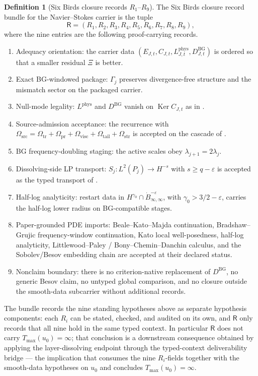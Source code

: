 \documentclass[11pt]{article}
\DeclareMathOperator{\Ker}{Ker}
\newcommand{\eps}{\varepsilon}
\newcommand{\DBG}{D^{\mathrm{BG}}}
\newcommand{\Lphys}{L^{\mathrm{phys}}}
\newcommand{\Tmax}{T_{\max}}
\newcommand{\Omsrc}{\Omega_{\mathrm{src}}}
\newcommand{\Omtr}{\Omega_{\mathrm{tr}}}
\newcommand{\Ompr}{\Omega_{\mathrm{pr}}}
\newcommand{\Omvisc}{\Omega_{\mathrm{visc}}}
\newcommand{\Omtail}{\Omega_{\mathrm{tail}}}
\newcommand{\Omstr}{\Omega_{\mathrm{str}}}
\newcommand{\LPtr}{S_j}
\theoremstyle{definition}
\newtheorem{definition}[theorem]{Definition}
\begin{document}
\begin{definition}[Six Birds closure records \(R_1\)--\(R_9\)]
\label{def:ns:closure-r1-r9}
The Six Birds closure record bundle for the Navier--Stokes carrier is
the tuple
\[
  \mathsf R=(R_1,R_2,R_3,R_4,R_5,R_6,R_7,R_8,R_9),
\]
where the nine entries are the following proof-carrying records.
\begin{enumerate}[label=$R_\arabic*$.]
\item Adequacy orientation: the carrier data
\((E_{J,t},C_{J,t},\Lphys_{J,t},\DBG_{J,t})\) is ordered so that a
smaller residual \(\Xi\) is better.
\item Exact BG-windowed package: \(\Gamma_j\) preserves
divergence-free structure and the mismatch sector on the packaged
carrier.
\item Null-mode legality: \(\Lphys\) and \(\DBG\) vanish on
\(\Ker C_{J,t}\) as in .
\item Source-admission acceptance: the recurrence with
\(\Omsrc=\Omtr+\Ompr+\Omvisc+\Omtail+\Omstr\) is accepted on the
cascade of .
\item BG frequency-doubling staging: the active scales obey
\(\lambda_{j+1}=2\lambda_j\).
\item Dissolving-side LP transport: \(\LPtr:L^2(P_j)\to H^{-s}\) with
\(s\ge q-\eps\) is accepted as the typed transport of
.
\item Half-log analyticity: restart data in
\(H^{\gamma_0}\cap\dot B^{-\eps}_{\infty,\infty}\), with
\(\gamma_0>3/2-\eps\), carries the half-log lower radius on
BG-compatible stages.
\item Paper-grounded PDE imports: Beale--Kato--Majda continuation,
Bradshaw--Grujic frequency-window continuation, Kato local
well-posedness, half-log analyticity, Littlewood--Paley /
Bony--Chemin--Danchin calculus, and the Sobolev/Besov embedding chain
are accepted at their declared status.
\item Nonclaim boundary: there is no criterion-native replacement of
\(\DBG\), no generic Besov claim, no untyped global comparison, and no
closure outside the smooth-data subcarrier without additional records.
\end{enumerate}
\end{definition}

The bundle records the nine standing hypotheses above as separate
hypothesis components: each \(R_i\) can be stated, checked, and
audited on its own, and \(\mathsf R\) only records that all nine hold
in the same
typed context.  In particular \(\mathsf R\) does not carry
\(\Tmax(u_0)=\infty\); that conclusion is a downstream consequence
obtained by applying the layer-dissolving endpoint through the
typed-context deliverability bridge --- the implication that consumes
the nine \(R_i\)-fields together with the smooth-data hypotheses on
\(u_0\) and concludes \(\Tmax(u_0)=\infty\).
\end{document}
